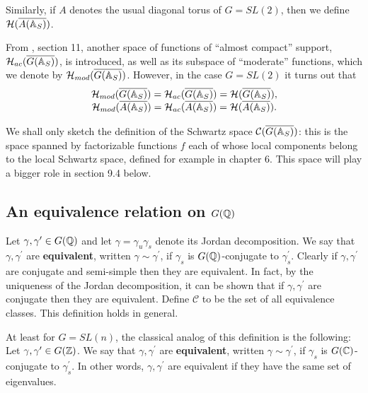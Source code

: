 Similarly, if $A$ denotes the usual
diagonal torus of $G=SL(2)$, then we define
${\cal{H}}(\overline{A({\Bbb{A}}_S)})$.

From \cite{A11}, section 11, another space of functions of
``almost compact'' support,
${\cal{H}}_{ac}(\overline{G({\Bbb{A}}_S)})$, is introduced,
as well as its subspace of ``moderate'' functions,
which we denote by
${\cal{H}}_{mod}(\overline{G({\Bbb{A}}_S)})$.
However, in the case $G=SL(2)$ it turns out that
\[
\begin{array}{c}
{\cal{H}}_{mod}(\overline{G({\Bbb{A}}_S)})=
{\cal{H}}_{ac}(\overline{G({\Bbb{A}}_S)})=
{\cal{H}}(\overline{G({\Bbb{A}}_S)}),\\  
{\cal{H}}_{mod}(\overline{A({\Bbb{A}}_S)})=
{\cal{H}}_{ac}(\overline{A({\Bbb{A}}_S)})=
{\cal{H}}(\overline{A({\Bbb{A}}_S)}).
\end{array}
\]

We shall only sketch the definition of the Schwartz
space ${\cal{C}}(\overline{G({\Bbb{A}}_S)})$: this is the space spanned by
factorizable functions $f$ each of whose local components
belong to the local Schwartz space, defined for example
in chapter 6. This space will play a bigger role in section 9.4 below.

\subsection{An equivalence relation on $G({\Bbb{Q}})$}

Let $\gamma ,\gamma ^{\prime }\in G({\Bbb{Q}})$ and let
$\gamma =\gamma_u\gamma _s$ denote its Jordan decomposition.
We say that $\gamma ,\gamma^{\prime }$ are \textbf{equivalent},
written $\gamma \sim \gamma ^{\prime }$,
if $\gamma _s$ is $G({\Bbb{Q}})$-conjugate to
$\gamma _s^{\prime }$. Clearly
if $\gamma ,\gamma ^{\prime }$ are conjugate and
semi-simple then they are
equivalent. In fact, by the uniqueness of the Jordan decomposition, it can
be shown that if $\gamma ,\gamma ^{\prime }$ are conjugate then they are
equivalent. Define $\mathcal{C}$ to be the set of all equivalence classes.
This definition holds in general.

At least for $G=SL(n)$, the classical analog of this definition is the
following: Let $\gamma ,\gamma ^{\prime }\in G({\Bbb{Z}})$. We say that
$\gamma ,\gamma ^{\prime }$ are \textbf{equivalent}, written $\gamma \sim
\gamma ^{\prime }$, if $\gamma _s$ is $G(\Bbb{C})$-conjugate to $\gamma
_s^{\prime } $. In other words, $\gamma ,\gamma ^{\prime }$ are equivalent
if they have the same set of eigenvalues.

